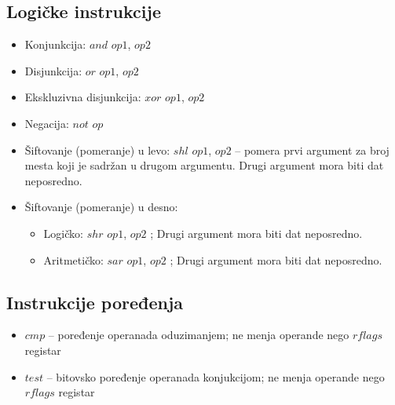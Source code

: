 \documentclass[a4paper, 10pt]{article}
\begin{document}
	\subsection{Logičke instrukcije}
	\begin{itemize}
		\item Konjunkcija: $and$ $op1$, $op2$
		\item Disjunkcija: $or$ $op1$, $op2$
		\item Ekskluzivna disjunkcija: $xor$ $op1$, $op2$
		\item Negacija: $not$ $op$
		\item Šiftovanje (pomeranje) u levo: $shl$ $op1$, $op2$ -- pomera prvi argument za broj mesta koji je sadržan u drugom argumentu. Drugi argument mora biti dat neposredno.
		\item Šiftovanje (pomeranje) u desno:
			\begin{itemize}
				\item Logičko: $shr$ $op1$, $op2$ ; Drugi argument mora biti dat neposredno.
				\item Aritmetičko: $sar$ $op1$, $op2$ ; Drugi argument mora biti dat neposredno.
			\end{itemize}
		
	\end{itemize}
	\subsection{Instrukcije poređenja}
	\begin{itemize}
		\item $cmp$ -- poređenje operanada oduzimanjem; ne menja operande nego $rflags$ registar
		\item $test$ -- bitovsko poređenje operanada konjukcijom; ne menja operande nego $rflags$ registar
	\end{itemize}
\end{document}
